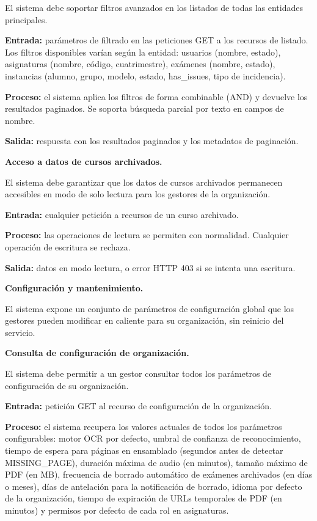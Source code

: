 \begin{functional}
\begin{functional}
    El sistema debe soportar filtros avanzados en los listados de todas las entidades principales.

    \textbf{Entrada:} parámetros de filtrado en las peticiones GET a los recursos de listado. Los filtros disponibles varían según la entidad: usuarios (nombre, estado), asignaturas (nombre, código, cuatrimestre), exámenes (nombre, estado), instancias (alumno, grupo, modelo, estado, has\_issues, tipo de incidencia).

    \textbf{Proceso:} el sistema aplica los filtros de forma combinable (AND) y devuelve los resultados paginados. Se soporta búsqueda parcial por texto en campos de nombre.

    \textbf{Salida:} respuesta con los resultados paginados y los metadatos de paginación.

    \item \textbf{Acceso a datos de cursos archivados.}

    El sistema debe garantizar que los datos de cursos archivados permanecen accesibles en modo de solo lectura para los gestores de la organización.

    \textbf{Entrada:} cualquier petición a recursos de un curso archivado.

    \textbf{Proceso:} las operaciones de lectura se permiten con normalidad. Cualquier operación de escritura se rechaza.

    \textbf{Salida:} datos en modo lectura, o error HTTP 403 si se intenta una escritura.

  \end{functional}

  \item \textbf{Configuración y mantenimiento.}

  El sistema expone un conjunto de parámetros de configuración global que los gestores pueden modificar en caliente para su organización, sin reinicio del servicio.

  \begin{functional}
    \item \textbf{Consulta de configuración de organización.}

    El sistema debe permitir a un gestor consultar todos los parámetros de configuración de su organización.

    \textbf{Entrada:} petición GET al recurso de configuración de la organización.

    \textbf{Proceso:} el sistema recupera los valores actuales de todos los parámetros configurables: motor OCR por defecto, umbral de confianza de reconocimiento, tiempo de espera para páginas en ensamblado (segundos antes de detectar MISSING\_PAGE), duración máxima de audio (en minutos), tamaño máximo de PDF (en MB), frecuencia de borrado automático de exámenes archivados (en días o meses), días de antelación para la notificación de borrado, idioma por defecto de la organización, tiempo de expiración de URLs temporales de PDF (en minutos) y permisos por defecto de cada rol en asignaturas.


\end{functional}
\end{functional}
